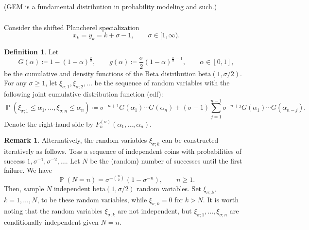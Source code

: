 \documentclass[letterpaper,11pt,oneside,reqno]{article}
\numberwithin{equation}{section}
\newcommand{\ssp}{\hspace{1pt}}
\theoremstyle{definition}
\newtheorem{definition}[proposition]{Definition}
\newtheorem{remark}[proposition]{Remark}
\begin{document}
(GEM is a fundamental distribution in probability modeling and such.)


\subsubsection{}


Consider
the shifted Plancherel specialization
\begin{equation}
	\label{eq:shifted_Plancherel_specialization}
	x_k=y_k=k+\sigma-1,\qquad \sigma\in[1,\infty).
\end{equation}

\begin{definition}
	\label{def:xi_sigma}
	Let
	\begin{equation}
		\label{eq:beta_1_sigma_2_density}
		G(\alpha)\coloneqq 1-(1-\alpha)^{\frac{\sigma}{2}},\qquad
		g(\alpha)\coloneqq \frac{\sigma}{2}(1-\alpha)^{\frac{\sigma}{2}-1},
		\qquad
		\alpha\in [0,1],
	\end{equation}
	be the cumulative and density functions of the Beta distribution $\mathrm{beta}(1,\sigma/2)$.
	For any $\sigma\ge1$,
	let $\xi_{\sigma;1},\xi_{\sigma;2},\ldots $ be the sequence of random variables
	with the following joint cumulative distribution function (cdf):
	\begin{equation}
		\label{eq:joint_cdf}
		\operatorname{\mathbb{P}}
		\left( \xi_{\sigma;1}\le \alpha_1,\ldots,\xi_{\sigma;n}\le \alpha_n  \right)\coloneqq
		\sigma^{-n+1}G(\alpha_1)\cdots G(\alpha_n)
		+
		(\sigma-1)
		\sum_{j=1}^{n-1}\sigma^{-n+j}G(\alpha_1)\cdots G(\alpha_{n-j}).
	\end{equation}
	Denote the right-hand side by
	$F_n^{(\sigma)}(\alpha_1,\ldots,\alpha_n )$.
\end{definition}
\begin{remark}
	Alternatively, the random variables
	$\xi_{\sigma;k}$ can be constructed iteratively as follows.
	Toss a sequence of independent coins with probabilities of
	success $1,\sigma^{-1},\sigma^{-2},\ldots $.
	Let $N$ be the (random) number of successes until the first
	failure. We have
	\begin{equation}
		\operatorname{\mathbb{P}}(N=n)=\sigma^{-\binom n2}\ssp(1-\sigma^{-n}),\qquad n\ge1.
	\end{equation}
	Then, sample $N$ independent
	$\mathrm{beta}(1,\sigma/2)$ random variables.
	Set $\xi_{\sigma;k}$,
	$k=1,\ldots,N $, to be these random variables,
	while $\xi_{\sigma;k}=0$ for $k>N$.
	It is worth noting
	that the random variables $\xi_{\sigma;k}$ are not
	independent, but $\xi_{\sigma;1},\ldots,\xi_{\sigma;n} $
	are conditionally independent given $N=n$.
\end{remark}
\end{document}
